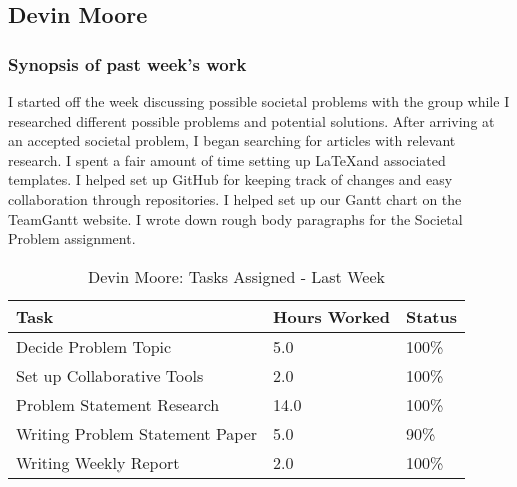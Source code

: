 \documentclass[12pt,article,compsoc]{IEEEtran}
\begin{document}
\subsection{Devin Moore}

	\subsubsection*{Synopsis of past week's work}

	I started off the week discussing possible societal problems with the group while I researched different possible problems and potential solutions. After arriving at an accepted societal problem, I began searching for articles with relevant research. I spent a fair amount of time setting up \LaTeX and associated templates. I helped set up GitHub for keeping track of changes and easy collaboration through repositories. I helped set up our Gantt chart on the TeamGantt website. I wrote down rough body paragraphs for the Societal Problem assignment.   


	\begin{table}[ht]
	\renewcommand{\arraystretch}{1.3}
		\caption{Devin Moore: Tasks Assigned - Last Week}
		
		\label{Summary of Devin Moore's activities: last week}
		
		\centering
		\begin{tabular}{p{5.5cm}|p{1cm}|p{1cm}}

		\hline
		\bfseries 	Task		 		& \bfseries Hours Worked	& \bfseries Status	\\
		\hline\hline
					Decide Problem Topic		& 5.0					& 100\%				\\	%
					Set up Collaborative Tools	& 2.0					& 100\%				\\
					Problem Statement Research	& 14.0					& 100\%				\\
					Writing Problem Statement Paper	& 5.0				& 90\%				\\
					Writing Weekly Report		& 2.0					& 100\%				\\	
		\hline
		\end{tabular}
	\end{table}
\end{document}
